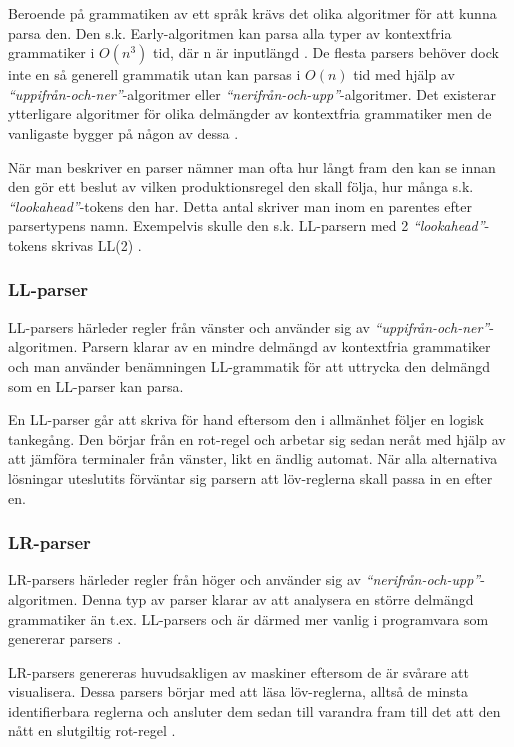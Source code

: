 Beroende på grammatiken av ett språk krävs det olika algoritmer för att kunna
parsa den. Den s.k. Early-algoritmen kan parsa alla typer av kontextfria
grammatiker i $O(n^3)$ tid, där n är inputlängd \citep[s. 67]{sm09}. De
flesta parsers behöver dock inte en så generell grammatik utan kan parsas i
$O(n)$ tid med hjälp av \textit{``uppifrån-och-ner''}-algoritmer eller
\textit{``nerifrån-och-upp''}-algoritmer. Det existerar ytterligare algoritmer
för olika delmängder av kontextfria grammatiker men de vanligaste bygger på
någon av dessa \citep[s. 61]{aa06}.

När man beskriver en parser nämner man ofta hur långt fram den kan se innan
den gör ett beslut av vilken produktionsregel den skall följa, hur många s.k.
\textit{``lookahead''}-tokens den har. Detta antal skriver man inom en
parentes efter parsertypens namn. Exempelvis skulle den s.k. LL-parsern med 2
\textit{``lookahead''}-tokens skrivas LL(2) \citep[s. 69]{sm09}.

\subsubsection{LL-parser}

LL-parsers härleder regler från vänster och använder sig av
\textit{``uppifrån-och-ner''}-algoritmen. Parsern klarar av en mindre delmängd
av kontextfria grammatiker och man använder benämningen LL-grammatik för att
uttrycka den delmängd som en LL-parser kan parsa.

En LL-parser går att skriva för hand eftersom den i allmänhet följer en logisk
tankegång. Den börjar från en rot-regel och arbetar sig sedan neråt
med hjälp av att jämföra terminaler från vänster, likt en ändlig
automat. När alla alternativa lösningar uteslutits förväntar sig parsern att
löv-reglerna skall passa in en efter en.

\subsubsection{LR-parser}

LR-parsers härleder regler från höger och använder sig av
\textit{``nerifrån-och-upp''}-algoritmen. Denna typ av parser klarar av att
analysera en större delmängd grammatiker än t.ex. LL-parsers och är därmed mer
vanlig i programvara som genererar parsers \citep[s. 61]{aa06}.

LR-parsers genereras huvudsakligen av maskiner eftersom de är svårare att
visualisera. Dessa parsers börjar med att läsa löv-reglerna, alltså de minsta
identifierbara reglerna och ansluter dem sedan till varandra fram till det att
den nått en slutgiltig rot-regel \citep[s. 67]{sm09}.

